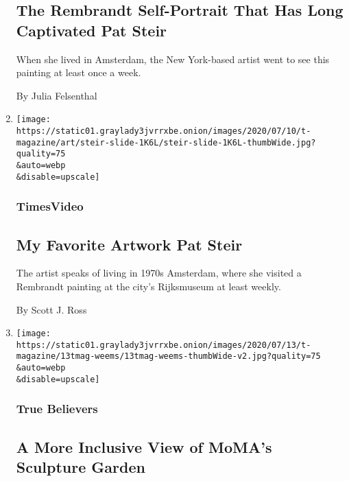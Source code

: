 \begin{enumerate}
  \hypertarget{the-rembrandt-self-portrait-that-has-long-captivated-pat-steir}{%
  \subsection{The Rembrandt Self-Portrait That Has Long Captivated Pat
  Steir}\label{the-rembrandt-self-portrait-that-has-long-captivated-pat-steir}}

  When she lived in Amsterdam, the New York-based artist went to see
  this painting at least once a week.

  By Julia Felsenthal
\item
  \href{/video/t-magazine/art/100000007194871/my-favorite-artwork-pat-steir.html}{}

  \texttt{[image: https://static01.graylady3jvrrxbe.onion/images/2020/07/10/t-magazine/art/steir-slide-1K6L/steir-slide-1K6L-thumbWide.jpg?quality=75\\\&auto=webp\\\&disable=upscale]}

  \hypertarget{timesvideo}{%
  \subsubsection{TimesVideo}\label{timesvideo}}

  \hypertarget{my-favorite-artwork--pat-steir}{%
  \subsection{My Favorite Artwork \textbar{} Pat
  Steir}\label{my-favorite-artwork--pat-steir}}

  The artist speaks of living in 1970s Amsterdam, where she visited a
  Rembrandt painting at the city's Rijksmuseum at least weekly.

  By Scott J. Ross
\item
  \href{/2020/07/21/t-magazine/carrie-mae-weems-moma-garden.html}{}

  \texttt{[image: https://static01.graylady3jvrrxbe.onion/images/2020/07/13/t-magazine/13tmag-weems/13tmag-weems-thumbWide-v2.jpg?quality=75\\\&auto=webp\\\&disable=upscale]}

  \hypertarget{true-believers-9}{%
  \subsubsection{True Believers}\label{true-believers-9}}

  \hypertarget{a-more-inclusive-view-of-momas-sculpture-garden}{%
  \subsection{A More Inclusive View of MoMA's Sculpture
  Garden}\label{a-more-inclusive-view-of-momas-sculpture-garden}}


\end{enumerate}

